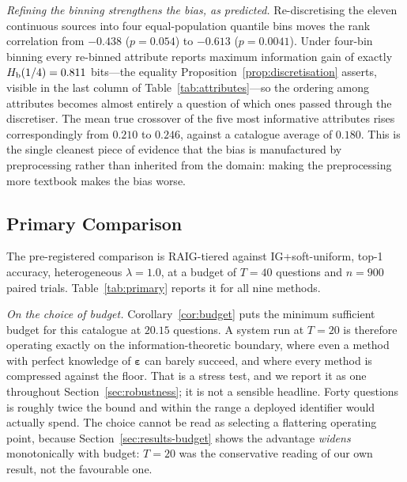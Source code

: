 \emph{Refining the binning strengthens the bias, as predicted.} Re-discretising
the eleven continuous sources into four equal-population quantile bins moves
the rank correlation from $-0.438$ ($p = 0.054$) to $-0.613$ ($p = 0.0041$).
Under four-bin binning every re-binned attribute reports maximum information
gain of exactly $H_{\mathrm{b}}(1/4) = 0.811$ bits---the equality
Proposition~\ref{prop:discretisation} asserts, visible in the last column of
Table~\ref{tab:attributes}---so the ordering among attributes becomes almost
entirely a question of which ones passed through the discretiser. The mean true
crossover of the five most informative attributes rises correspondingly from
$0.210$ to $0.246$, against a catalogue average of $0.180$. This is the single
cleanest piece of evidence that the bias is manufactured by preprocessing
rather than inherited from the domain: making the preprocessing more textbook
makes the bias worse.

\subsection{Primary Comparison}
\label{sec:results-main}

The pre-registered comparison is RAIG-tiered against IG+soft-uniform, top-1
accuracy, heterogeneous $\lambda = 1.0$, at a budget of $T = 40$ questions and
$n = 900$ paired trials. Table~\ref{tab:primary} reports it for all nine
methods.

\emph{On the choice of budget.} Corollary~\ref{cor:budget} puts the minimum
sufficient budget for this catalogue at $20.15$ questions. A system run at
$T=20$ is therefore operating exactly on the information-theoretic boundary,
where even a method with perfect knowledge of $\boldsymbol\varepsilon$ can
barely succeed, and where every method is compressed against the floor. That is
a stress test, and we report it as one throughout
Section~\ref{sec:robustness}; it is not a sensible headline. Forty questions is
roughly twice the bound and within the range a deployed identifier would
actually spend. The choice cannot be read as selecting a flattering operating
point, because Section~\ref{sec:results-budget} shows the advantage
\emph{widens} monotonically with budget: $T=20$ was the conservative reading of
our own result, not the favourable one.

